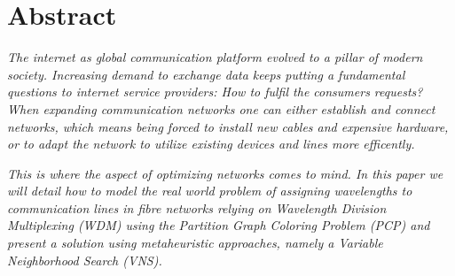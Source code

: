 \vspace*{\fill}
\section*{Abstract}
\textit{The internet as global communication platform evolved to a pillar of modern society. Increasing demand to exchange data keeps putting a fundamental questions to internet service providers: How to fulfil the consumers requests? When expanding communication networks one can either establish and connect networks, which means being forced to install new cables and expensive hardware, or to adapt the network to utilize existing devices and lines more efficently.}

\textit{This is where the aspect of optimizing networks comes to mind. In this paper we will detail how to model the real world problem of assigning wavelengths to communication lines in fibre networks relying on Wavelength Division Multiplexing (WDM) using the Partition Graph Coloring Problem (PCP) and present a solution using metaheuristic approaches, namely a Variable Neighborhood Search (VNS).}
\vspace*{\fill}
